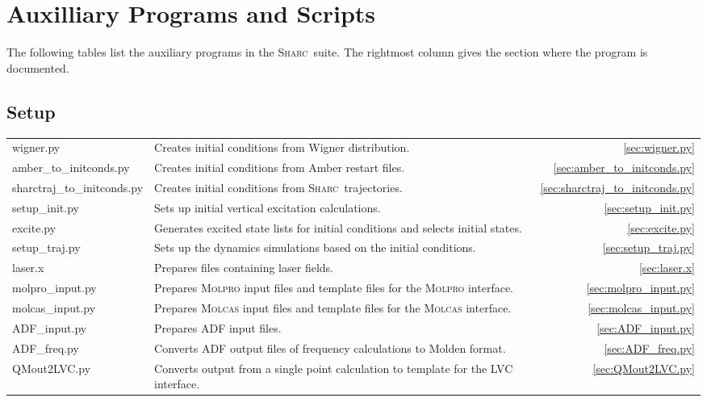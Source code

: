 \documentclass[a4paper,10pt,DIV=15,openany,twoside=false]{scrbook}
\newcommand{\sharc}{\textsc{Sharc}}
\begin{document}
\section{Auxilliary Programs and Scripts}

The following tables list the auxiliary programs in the \sharc\ suite. The rightmost column gives the section where the program is documented.

\subsection{Setup}

\begin{tabular}{>{\ttfamily}lp{10.5cm}r}
  wigner.py             &Creates initial conditions from Wigner distribution.                   &\ref{sec:wigner.py}\\
  amber\_to\_initconds.py       &Creates initial conditions from Amber restart files.           &\ref{sec:amber_to_initconds.py}\\
  sharctraj\_to\_initconds.py   &Creates initial conditions from \sharc\ trajectories.          &\ref{sec:sharctraj_to_initconds.py}\\
  setup\_init.py        &Sets up initial vertical excitation calculations.                      &\ref{sec:setup_init.py}\\
  excite.py             &Generates excited state lists for initial conditions and selects initial states.                 &\ref{sec:excite.py}\\
  setup\_traj.py        &Sets up the dynamics simulations based on the initial conditions.      &\ref{sec:setup_traj.py}\\
  laser.x               &Prepares files containing laser fields.                                &\ref{sec:laser.x}\\
  molpro\_input.py      &Prepares \textsc{Molpro} input files and template files for the \textsc{Molpro} interface.                  &\ref{sec:molpro_input.py}\\
  molcas\_input.py      &Prepares \textsc{Molcas} input files and template files for the \textsc{Molcas} interface.             &\ref{sec:molcas_input.py}\\
  ADF\_input.py         &Prepares ADF input files.                     &\ref{sec:ADF_input.py}\\
  ADF\_freq.py          &Converts ADF output files of frequency calculations to Molden format.                     &\ref{sec:ADF_freq.py}\\
  QMout2LVC.py          &Converts output from a single point calculation to template for the LVC interface.             &\ref{sec:QMout2LVC.py}\\
\end{tabular}
\end{document}
